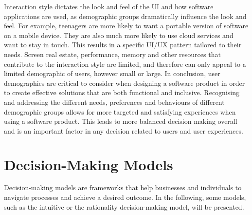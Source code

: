 \newline \noindent Interaction style dictates the look and feel of the UI and how software applications are used, as demographic groups dramatically influence the look and feel. For example, teenagers are more likely to want a portable version of software on a mobile device. They are also much more likely to use cloud services and want to stay in touch. This results in a specific UI/UX pattern tailored to their needs. Screen real estate, performance, memory and other resources that contribute to the interaction style are limited, and therefore can only appeal to a limited demographic of users, however small or large.
\newline \noindent In conclusion, user demographics are critical to consider when designing a software product in order to create effective solutions that are both functional and inclusive. Recognising and addressing the different needs, preferences and behaviours of different demographic groups allows for more targeted and satisfying experiences when using a software product. This leads to more balanced decision making overall and is an important factor in any decision related to users and user experiences. \cite{targeting_demo_2012}



\newpage 
\section{Decision-Making Models}
Decision-making models are frameworks that help businesses and individuals to navigate processes and achieve a desired outcome. In the following, some models, such as the intuitive or the rationality decision-making model, will be presented. 

